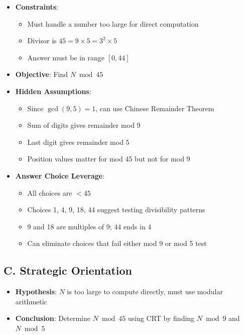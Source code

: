 \documentclass[11pt]{article}
\begin{document}
\begin{problemconfigbox}
\begin{itemize}[leftmargin=*]
    \item \textbf{Constraints}: 
    \begin{itemize}
        \item Must handle a number too large for direct computation
        \item Divisor is $45 = 9 \times 5 = 3^2 \times 5$
        \item Answer must be in range $[0, 44]$
    \end{itemize}
    
    \item \textbf{Objective}: Find $N \bmod 45$
    
    \item \textbf{Hidden Assumptions}: 
    \begin{itemize}
        \item Since $\gcd(9,5) = 1$, can use Chinese Remainder Theorem
        \item Sum of digits gives remainder mod 9
        \item Last digit gives remainder mod 5
        \item Position values matter for mod 45 but not for mod 9
    \end{itemize}
    
    \item \textbf{Answer Choice Leverage}: 
    \begin{itemize}
        \item All choices are $< 45$
        \item Choices 1, 4, 9, 18, 44 suggest testing divisibility patterns
        \item 9 and 18 are multiples of 9; 44 ends in 4
        \item Can eliminate choices that fail either mod 9 or mod 5 test
    \end{itemize}
\end{itemize}

\subsection*{C. Strategic Orientation}
\begin{itemize}[leftmargin=*]
    \item \textbf{Hypothesis}: $N$ is too large to compute directly, must use modular arithmetic
    
    \item \textbf{Conclusion}: Determine $N \bmod 45$ using CRT by finding $N \bmod 9$ and $N \bmod 5$
    

\end{itemize}
\end{problemconfigbox}
\end{document}
